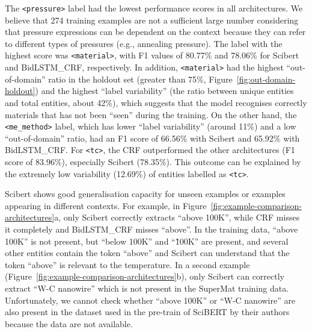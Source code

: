 \documentclass[]{interact}
\theoremstyle{plain}%
\theoremstyle{definition}
\theoremstyle{remark}
\begin{document}
The \texttt{<pressure>} label had the lowest performance scores in all architectures. We believe that 274 training examples are not a sufficient large number considering that pressure expressions can be dependent on the context because they can refer to different types of pressures (e.g., annealing pressure).
The label with the highest score was \texttt{<material>}, with F1 values of 80.77\% and 78.06\% for Scibert and BidLSTM\_CRF, respectively. In addition, \texttt{<material>} had the highest ``out-of-domain'' ratio in the holdout set (greater than 75\%, Figure~\ref{fig:out-domain-holdout}) and the highest ``label variability'' (the ratio between unique entities and total entities, about 42\%), which suggests that the model recognises correctly materials that has not been ``seen'' during the training.
On the other hand, the \texttt{<me\_method>} label, which has lower ``label variability'' (around 11\%) and a low ``out-of-domain'' ratio, had an F1 score of 66.56\% with Scibert and 65.92\% with BidLSTM\_CRF.
For \texttt{<tc>}, the CRF outperformed the other architectures (F1 score of 83.96\%), especially Scibert (78.35\%). 
This outcome can be explained by the extremely low variability (12.69\%) of entities labelled as \texttt{<tc>}. %

Scibert shows good generalisation capacity for unseen examples or examples appearing in different contexts.
For example, in Figure~\ref{fig:example-comparison-architectures}a, only Scibert correctly extracts ``above 100K'', while CRF misses it completely and BidLSTM\_CRF misses ``above''.
In the training data, ``above 100K'' is not present, but ``below 100K'' and ``\~100K'' are present, and several other entities contain the token ``above'' and Scibert can understand that the token ``above'' is relevant to the temperature.
In a second example (Figure~\ref{fig:example-comparison-architectures}b), only Scibert can correctly extract ``W-C nanowire'' which is not present in the SuperMat training data.
Unfortunately, we cannot check whether ``above 100K'' or ``W-C nanowire'' are also present in the dataset used in the pre-train of SciBERT by their authors~\cite{Beltagy2019SciBERT} because the data are not available.
\end{document}
